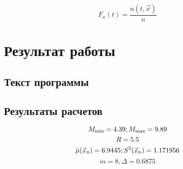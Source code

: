 \begin{equation}
    F_n(t) = \frac{n(t, \vec x)}{n}
\end{equation}



\chapter{Результат работы}

\section{Текст программы}



\section{Результаты расчетов}
\begin{equation*}
    M_{\min} = 4.39;  M_{\max} = 9.89 \\
\end{equation*}
\begin{equation*}
    R = 5.5 \\
\end{equation*}
\begin{equation*}
    \hat\mu(\vec x_n) = 6.9445; S^2(\vec x_n) = 1.171956 \\
\end{equation*}
\begin{equation*}
    m = 8, \Delta = 0.6875
\end{equation*}





